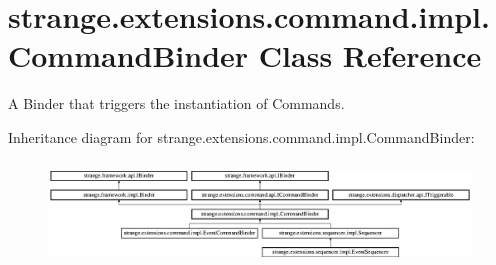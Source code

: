 \hypertarget{classstrange_1_1extensions_1_1command_1_1impl_1_1_command_binder}{\section{strange.\-extensions.\-command.\-impl.\-Command\-Binder Class Reference}
\label{classstrange_1_1extensions_1_1command_1_1impl_1_1_command_binder}
}


A Binder that triggers the instantiation of Commands.  


Inheritance diagram for strange.\-extensions.\-command.\-impl.\-Command\-Binder\-:\begin{figure}[H]
\begin{center}
\leavevmode
\includegraphics[height=2.777778cm]{classstrange_1_1extensions_1_1command_1_1impl_1_1_command_binder}
\end{center}
\end{figure}
